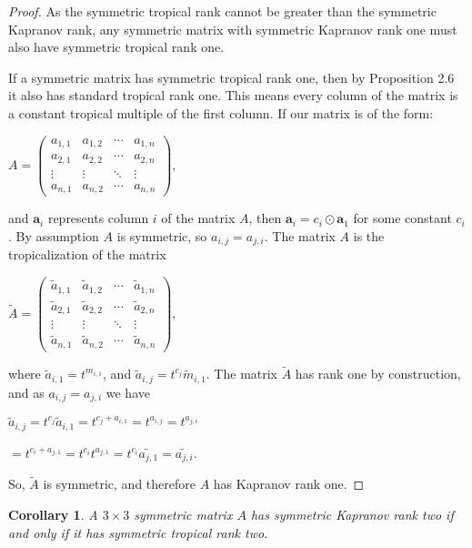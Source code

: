 \documentclass{article}
\begin{document}
\begin{proof}
  As the symmetric tropical rank cannot be greater than the symmetric Kapranov rank, any symmetric matrix with symmetric Kapranov rank one must also have symmetric tropical rank one.
  
  If a symmetric matrix has symmetric tropical rank one, then by Proposition 2.6 it also has standard tropical rank one. This means every column of the matrix is a constant tropical multiple of the first column. If our matrix is of the form:
  \begin{center}
    $A = \left(\begin{array}{cccc} a_{1,1} & a_{1,2} & \cdots & a_{1,n} \\ a_{2,1} & a_{2,2} & \cdots & a_{2,n} \\ \vdots & \vdots & \ddots & \vdots \\ a_{n,1} & a_{n,2} & \cdots & a_{n,n} \end{array}\right)$,
  \end{center}
  and $\textbf{a}_{i}$ represents column $i$ of the matrix $A$, then $\textbf{a}_{i} = c_{i} \odot \textbf{a}_{1}$ for some constant $c_{i}$. By assumption $A$ is symmetric, so $a_{i,j} = a_{j,i}$. The matrix $A$ is the tropicalization of the matrix
  \begin{center}
    $\tilde{A} = \left(\begin{array}{cccc} \tilde{a}_{1,1} & \tilde{a}_{1,2} & \cdots & \tilde{a}_{1,n} \\ \tilde{a}_{2,1} & \tilde{a}_{2,2} & \cdots & \tilde{a}_{2,n} \\ \vdots & \vdots & \ddots & \vdots \\ \tilde{a}_{n,1} & \tilde{a}_{n,2} & \cdots & \tilde{a}_{n,n} \end{array}\right)$,
  \end{center}
  where $\tilde{a}_{i,1} = t^{m_{i,1}}$, and $\tilde{a}_{i,j} = t^{c_{j}}\tilde{m}_{i,1}$. The matrix $\tilde{A}$ has rank one by construction, and as $a_{i,j} = a_{j,i}$ we have 
  \begin{center}
    $\tilde{a}_{i,j} = t^{c_{j}}\tilde{a}_{i,1} = t^{c_{j} + a_{i,1}} = t^{a_{i,j}} = t^{a_{j,i}}$
    
    $= t^{c_{i} + a_{j,1}} = t^{c_{i}}t^{a_{j,1}} = t^{c_{i}}\tilde{a_{j,1}} = \tilde{a_{j,i}}$. 
  \end{center}
  So, $\tilde{A}$ is symmetric, and therefore $A$ has Kapranov rank one.
\end{proof}

\newtheorem{cor}{Corollary}
\begin{cor}
  A $3 \times 3$ symmetric matrix $A$ has symmetric Kapranov rank two if and only if it has symmetric tropical rank two.
\end{cor}
\end{document}
